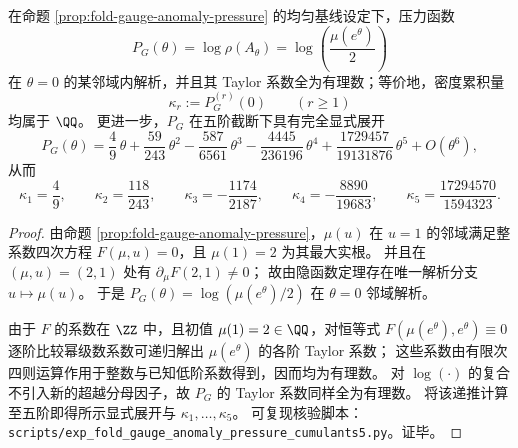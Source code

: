 


\begin{proposition}[压力函数的全阶有理累积量与五阶显式展开]\label{prop:fold-gauge-anomaly-pressure-cumulants-up-to-5}
在命题 \ref{prop:fold-gauge-anomaly-pressure} 的均匀基线设定下，压力函数
\[
P_G(\theta)=\log\rho(A_\theta)=\log\!\left(\frac{\mu(e^\theta)}{2}\right)
\]
在 \(\theta=0\) 的某邻域内解析，并且其 Taylor 系数全为有理数；等价地，密度累积量
\[
\kappa_r:=P_G^{(r)}(0)\qquad (r\ge 1)
\]
均属于 \(\QQ\)。
更进一步，\(P_G\) 在五阶截断下具有完全显式展开
\[
P_G(\theta)
=\frac49\,\theta+\frac{59}{243}\,\theta^2-\frac{587}{6561}\,\theta^3-\frac{4445}{236196}\,\theta^4+\frac{1729457}{19131876}\,\theta^5+O(\theta^6),
\]
从而
\[
\kappa_1=\frac49,\qquad
\kappa_2=\frac{118}{243},\qquad
\kappa_3=-\frac{1174}{2187},\qquad
\kappa_4=-\frac{8890}{19683},\qquad
\kappa_5=\frac{17294570}{1594323}.
\]
\end{proposition}
\begin{proof}
由命题 \ref{prop:fold-gauge-anomaly-pressure}，\(\mu(u)\) 在 \(u=1\) 的邻域满足整系数四次方程 \(F(\mu,u)=0\)，且 \(\mu(1)=2\) 为其最大实根。
并且在 \((\mu,u)=(2,1)\) 处有 \(\partial_\mu F(2,1)\neq 0\)；
故由隐函数定理存在唯一解析分支 \(u\mapsto \mu(u)\)。
于是 \(P_G(\theta)=\log(\mu(e^\theta)/2)\) 在 \(\theta=0\) 邻域解析。
\par
由于 \(F\) 的系数在 \(\ZZ\) 中，且初值 \(\mu(1)=2\in\QQ\)，对恒等式
\(
F(\mu(e^\theta),e^\theta)\equiv 0
\)
逐阶比较幂级数系数可递归解出 \(\mu(e^\theta)\) 的各阶 Taylor 系数；
这些系数由有限次四则运算作用于整数与已知低阶系数得到，因而均为有理数。
对 \(\log(\cdot)\) 的复合不引入新的超越分母因子，故 \(P_G\) 的 Taylor 系数同样全为有理数。
将该递推计算至五阶即得所示显式展开与 \(\kappa_1,\dots,\kappa_5\)。
可复现核验脚本：\texttt{scripts/exp\_fold\_gauge\_anomaly\_pressure\_cumulants5.py}。证毕。
\end{proof}










